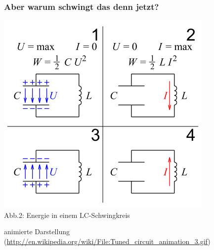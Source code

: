 \begin{frame}
\frametitle{Aber warum schwingt das denn jetzt?}
\begin{center}
	\includegraphics[width=.8\textwidth,height=.8\textheight,keepaspectratio]{e07/Schwingkreis.png}\\
	Abb.2: Energie in einem LC-Schwingkreis \cite{wmde} \\
\end{center}
\end{frame}

\begin{frame}
  \begin{center}
  \tiny{animierte Darstellung (\url{http://en.wikipedia.org/wiki/File:Tuned_circuit_animation_3.gif})}
  \end{center}
\end{frame}

